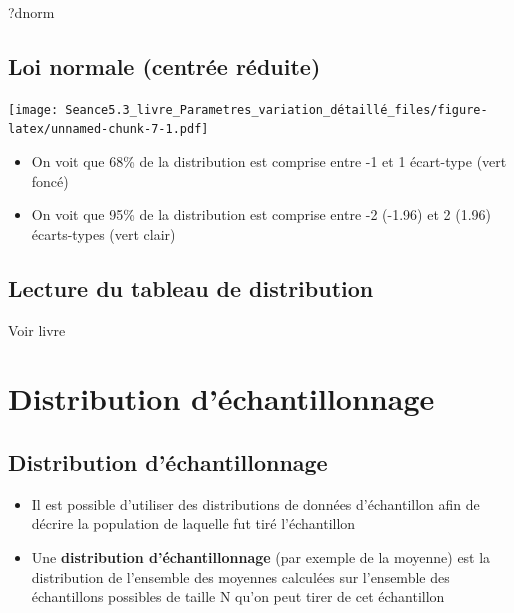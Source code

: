\documentclass[
]{article}
\newenvironment{Shaded}{\begin{snugshade}}{\end{snugshade}}
\newcommand{\NormalTok}[1]{#1}
\providecommand{\tightlist}{%
  \setlength{\itemsep}{0pt}\setlength{\parskip}{0pt}}
\begin{document}
\begin{Shaded}
\begin{Highlighting}[]
\NormalTok{?dnorm}
\end{Highlighting}
\end{Shaded}

\hypertarget{loi-normale-centruxe9e-ruxe9duite-2}{%
\subsection{Loi normale (centrée
réduite)}\label{loi-normale-centruxe9e-ruxe9duite-2}}

\texttt{[image: Seance5.3\_livre\_Parametres\_variation\_détaillé\_files/figure-latex/unnamed-chunk-7-1.pdf]}

\begin{itemize}
\tightlist
\item
  On voit que 68\% de la distribution est comprise entre -1 et 1
  écart-type (vert foncé)
\item
  On voit que 95\% de la distribution est comprise entre -2 (-1.96) et 2
  (1.96) écarts-types (vert clair)
\end{itemize}

\hypertarget{lecture-du-tableau-de-distribution}{%
\subsection{Lecture du tableau de
distribution}\label{lecture-du-tableau-de-distribution}}

Voir livre

\hypertarget{distribution-duxe9chantillonnage}{%
\section{Distribution
d'échantillonnage}\label{distribution-duxe9chantillonnage}}

\hypertarget{distribution-duxe9chantillonnage-1}{%
\subsection{Distribution
d'échantillonnage}\label{distribution-duxe9chantillonnage-1}}

\begin{itemize}
\item
  Il est possible d'utiliser des distributions de données d'échantillon
  afin de décrire la population de laquelle fut tiré l'échantillon
\item
  Une \textbf{distribution d'échantillonnage} (par exemple de la
  moyenne) est la distribution de l'ensemble des moyennes calculées sur
  l'ensemble des échantillons possibles de taille N qu'on peut tirer de
  cet échantillon
\end{itemize}
\end{document}
